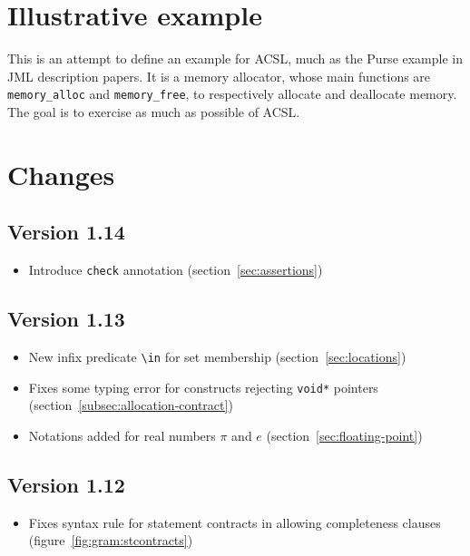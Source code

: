 \documentclass[web]{frama-c-book}
\begin{document}








\section{Illustrative example}
\label{sec:illustrative-example}
This is an attempt to define an example for ACSL, much as the Purse
example in JML description papers.  It is a memory allocator, whose
main functions are \lstinline|memory_alloc| and \lstinline|memory_free|, to
respectively allocate and deallocate memory.  The goal is to exercise
as much as possible of ACSL.

%

\section{Changes}

\subsection{Version 1.14} %
\begin{itemize}
\item Introduce \lstinline|check| annotation (section~\ref{sec:assertions})
\end{itemize}

\subsection{Version 1.13} %
\begin{itemize}
\item New infix predicate \lstinline|\in| for set membership
  (section~\ref{sec:locations})
\item Fixes some typing error for constructs rejecting \lstinline|void*| pointers (section~\ref{subsec:allocation-contract})
\item Notations added for real numbers $\pi$ and $e$ (section~\ref{sec:floating-point})
\end{itemize}

\subsection{Version 1.12} %
\begin{itemize}
\item Fixes syntax rule for statement contracts in allowing completeness clauses
  (figure~\ref{fig:gram:stcontracts})
\end{itemize}
\end{document}
